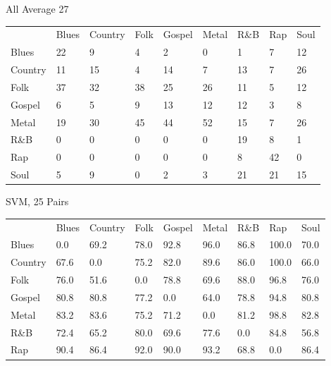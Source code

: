 \documentclass[a4paper,oneside]{article}
\begin{document}
All
Average 27
\begin{table}
\begin{tabular}{|l||*{8}{l|}} \hline
 & Blues & Country & Folk & Gospel & Metal & R\&B & Rap & Soul \\ \hhline{|=||*{8}{=|}}
Blues & 22 & 9 & 4 & 2 & 0 & 1 & 7 & 12 \\ \hline
Country & 11 & 15 & 4 & 14 & 7 & 13 & 7 & 26 \\ \hline
Folk & 37 & 32 & 38 & 25 & 26 & 11 & 5 & 12 \\ \hline
Gospel & 6 & 5 & 9 & 13 & 12 & 12 & 3 & 8 \\ \hline
Metal & 19 & 30 & 45 & 44 & 52 & 15 & 7 & 26 \\ \hline
R\&B & 0 & 0 & 0 & 0 & 0 & 19 & 8 & 1 \\ \hline
Rap & 0 & 0 & 0 & 0 & 0 & 8 & 42 & 0 \\ \hline
Soul & 5 & 9 & 0 & 2 & 3 & 21 & 21 & 15 \\ \hline
\end{tabular}
\end{table}

SVM, 25
Pairs
\begin{table}
\begin{tabular}{|l||*{8}{l|}} \hline
 & Blues & Country & Folk & Gospel & Metal & R\&B & Rap & Soul \\ \hhline{|=||*{8}{=|}}
Blues & 0.0 & 69.2 & 78.0 & 92.8 & 96.0 & 86.8 & 100.0 & 70.0 \\ \hline
Country & 67.6 & 0.0 & 75.2 & 82.0 & 89.6 & 86.0 & 100.0 & 66.0 \\ \hline
Folk & 76.0 & 51.6 & 0.0 & 78.8 & 69.6 & 88.0 & 96.8 & 76.0 \\ \hline
Gospel & 80.8 & 80.8 & 77.2 & 0.0 & 64.0 & 78.8 & 94.8 & 80.8 \\ \hline
Metal & 83.2 & 83.6 & 75.2 & 71.2 & 0.0 & 81.2 & 98.8 & 82.8 \\ \hline
R\&B & 72.4 & 65.2 & 80.0 & 69.6 & 77.6 & 0.0 & 84.8 & 56.8 \\ \hline
Rap & 90.4 & 86.4 & 92.0 & 90.0 & 93.2 & 68.8 & 0.0 & 86.4 \\ \hline
\end{tabular}
\end{table}
\end{document}
